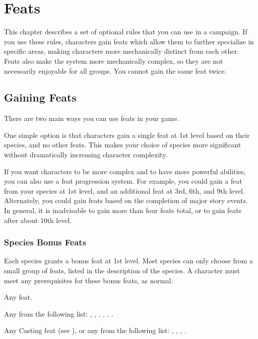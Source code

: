 \chapter{Feats}\label{Feats}

This chapter describes a set of optional rules that you can use in a campaign.
If you use these rules, characters gain feats which allow them to further specialize in specific areas, making characters more mechanically distinct from each other.
Feats also make the system more mechanically complex, so they are not necessarily enjoyable for all groups.
You cannot gain the same feat twice.

\section{Gaining Feats}
    There are two main ways you can use feats in your game.

    One simple option is that characters gain a single feat at 1st level based on their species, and no other feats.
    This makes your choice of species more significant without dramatically increasing character complexity.

    If you want characters to be more complex and to have more powerful abilities, you can also use a feat progression system.
    For example, you could gain a feat from your species at 1st level, and an additional feat at 3rd, 6th, and 9th level.
    Alternately, you could gain feats based on the completion of major story events.
    In general, it is inadvisable to gain more than four feats total, or to gain feats after about 10th level.

    \subsection{Species Bonus Feats}\label{Species Bonus Feats}
        Each species grants a bonus feat at 1st level. Most species can only choose from a small group of feats, listed in the description of the species. A character must meet any prerequisites for these bonus feats, as normal.

         Any feat.

         Any from the following list: , , , , , .

         Any Casting feat (see ), or any from the following list: , , , .

